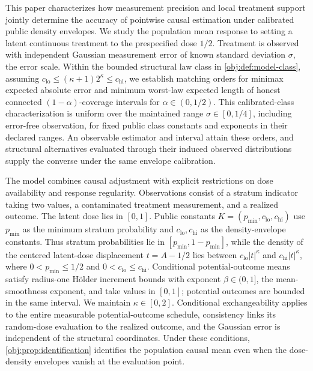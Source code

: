 This paper characterizes how measurement precision and local treatment support jointly determine the accuracy of pointwise causal estimation under calibrated public density envelopes. We study the population mean response to setting a latent continuous treatment to the prespecified dose \(1/2\). Treatment is observed with independent Gaussian measurement error of known standard deviation \(\sigma\), the error scale. Within the bounded structural law class in \cref{obj:def:model-class}, assuming \(c_{\mathrm{lo}}\le(\kappa+1)2^\kappa\le c_{\mathrm{hi}}\), we establish matching orders for minimax expected absolute error and minimum worst-law expected length of honest connected \((1-\alpha)\)-coverage intervals for \(\alpha\in(0,1/2)\). This calibrated-class characterization is uniform over the maintained range \(\sigma\in[0,1/4]\), including error-free observation, for fixed public class constants and exponents in their declared ranges. An observable estimator and interval attain these orders, and structural alternatives evaluated through their induced observed distributions supply the converse under the same envelope calibration.

The model combines causal adjustment with explicit restrictions on dose availability and response regularity. Observations consist of a stratum indicator taking two values, a contaminated treatment measurement, and a realized outcome. The latent dose lies in \([0,1]\). Public constants \(K=(p_{\min},c_{\mathrm{lo}},c_{\mathrm{hi}})\) use \(p_{\min}\) as the minimum stratum probability and \(c_{\mathrm{lo}},c_{\mathrm{hi}}\) as the density-envelope constants. Thus stratum probabilities lie in \([p_{\min},1-p_{\min}]\), while the density of the centered latent-dose displacement \(t=A-1/2\) lies between \(c_{\mathrm{lo}}|t|^\kappa\) and \(c_{\mathrm{hi}}|t|^\kappa\), where \(0<p_{\min}\le1/2\) and \(0<c_{\mathrm{lo}}\le c_{\mathrm{hi}}\). Conditional potential-outcome means satisfy radius-one Hölder increment bounds with exponent \(\beta\in(0,1]\), the mean-smoothness exponent, and take values in \([0,1]\); potential outcomes are bounded in the same interval. We maintain \(\kappa\in[0,2]\). Conditional exchangeability applies to the entire measurable potential-outcome schedule, consistency links its random-dose evaluation to the realized outcome, and the Gaussian error is independent of the structural coordinates. Under these conditions, \cref{obj:prop:identification} identifies the population causal mean even when the dose-density envelopes vanish at the evaluation point.

